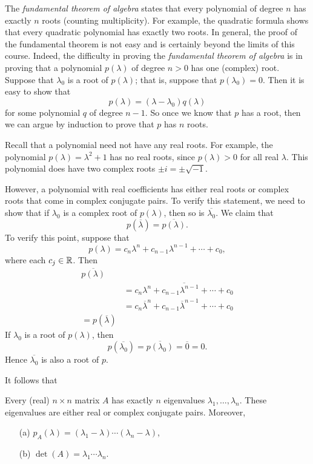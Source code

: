 \documentclass{ximera}
\begin{document}
The {\em fundamental theorem of algebra\/}  states that every polynomial of degree $n$
has exactly $n$ roots (counting multiplicity).  For example, the 
quadratic formula shows that 
every quadratic polynomial has exactly two roots.  In general, the proof 
of the fundamental theorem is not easy and is certainly beyond the 
limits of this course.  Indeed, the difficulty in proving the {\em
fundamental theorem of algebra\/} is in proving that a
polynomial $p(\lambda)$ of degree $n>0$ has one (complex) root.
Suppose that $\lambda_0$ is a root of $p(\lambda)$; that is,
suppose that $p(\lambda_0)=0$. Then it is easy to show that
\begin{equation}  \label{e:factoring}
p(\lambda) = (\lambda-\lambda_0)q(\lambda)
\end{equation}
for some polynomial $q$ of degree $n-1$.  So once we know that
$p$ has a root, then we can argue by induction to prove that $p$
has $n$ roots.  

Recall that a polynomial need not have any real roots. For
example, the polynomial $p(\lambda)=\lambda^2+1$ has no real
roots, since $p(\lambda)> 0$ for all real $\lambda$.  This
polynomial does have two complex roots $\pm i =\pm\sqrt{-1}$.  

However, a polynomial with real coefficients has either real
roots or complex roots that come in complex conjugate pairs.  To
verify this statement, we need to show that if $\lambda_0$ is a
complex root of $p(\lambda)$, then so is $\overline{\lambda_0}$.
We claim that 
\[
p(\overline{\lambda})=\overline{p(\lambda)}.
\]
To verify this point, suppose that
\[
p(\lambda) = c_n\lambda^n + c_{n-1}\lambda^{n-1} + \cdots + c_0,
\]
where each $c_j\in\mbox{$\Bbb{R}$}$.  Then
\begin{align*}
\overline{p(\lambda)} \\
&=\overline{c_n\lambda^n + c_{n-1}\lambda^{n-1} + \cdots + c_0}  \\
&= c_n\overline{\lambda}^n + c_{n-1}\overline{\lambda}^{n-1} + \cdots + c_0 \\
= p(\overline{\lambda})
\end{align*}
If $\lambda_0$ is a root of $p(\lambda)$, then
\[
p(\overline{\lambda_0}) = \overline{p(\lambda_0)}=\overline{0}=0.
\]
Hence $\overline{\lambda_0}$ is also a root of $p$.

It follows that 
\begin{theorem}  \label{T:eigens}
Every (real) $n\times n$ matrix $A$ has exactly $n$ eigenvalues
$\lambda_1,\ldots,\lambda_n$.  These eigenvalues are either real
or complex conjugate pairs.  Moreover,
\begin{enumerate}
\item[(a)] $p_A(\lambda) = (\lambda_1-\lambda)\cdots(\lambda_n-\lambda)$,
\item[(b)] $\det(A) = \lambda_1\cdots\lambda_n$.
\end{enumerate}
\end{theorem} 
\end{document}
